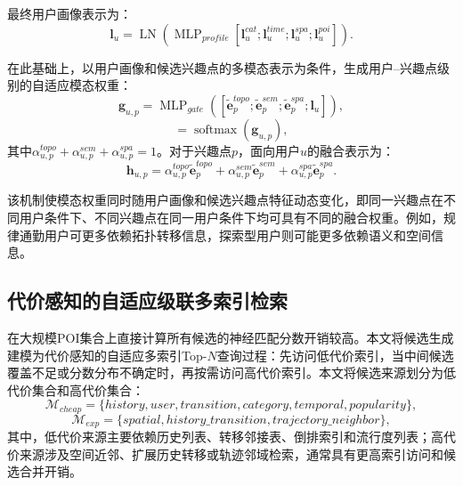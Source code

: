 \documentclass{rjthesis}
\begin{document}
最终用户画像表示为：
\begin{equation}
\mathbf l_u=\operatorname{LN}\left(\operatorname{MLP}_{profile}[\mathbf l_u^{cat};\mathbf l_u^{time};\mathbf l_u^{spa};\mathbf l_u^{poi}]\right).
\end{equation}

在此基础上，以用户画像和候选兴趣点的多模态表示为条件，生成用户--兴趣点级别的自适应模态权重：
\begin{equation}
\mathbf g_{u,p}=\operatorname{MLP}_{gate}\left([
\widetilde{\mathbf e}_p^{topo};
\widetilde{\mathbf e}_p^{sem};
\widetilde{\mathbf e}_p^{spa};
\mathbf l_u]
\right),
\end{equation}
\begin{equation}
[\alpha_{u,p}^{topo},\alpha_{u,p}^{sem},\alpha_{u,p}^{spa}]
=\operatorname{softmax}(\mathbf g_{u,p}),
\end{equation}
其中$\alpha_{u,p}^{topo}+\alpha_{u,p}^{sem}+\alpha_{u,p}^{spa}=1$。对于兴趣点$p$，面向用户$u$的融合表示为：
\begin{equation}
\mathbf h_{u,p}=\alpha_{u,p}^{topo}\widetilde{\mathbf e}_p^{topo}
+\alpha_{u,p}^{sem}\widetilde{\mathbf e}_p^{sem}
+\alpha_{u,p}^{spa}\widetilde{\mathbf e}_p^{spa}.
\end{equation}

该机制使模态权重同时随用户画像和候选兴趣点特征动态变化，即同一兴趣点在不同用户条件下、不同兴趣点在同一用户条件下均可具有不同的融合权重。例如，规律通勤用户可更多依赖拓扑转移信息，探索型用户则可能更多依赖语义和空间信息。


\subsection{代价感知的自适应级联多索引检索}

在大规模POI集合上直接计算所有候选的神经匹配分数开销较高。本文将候选生成建模为代价感知的自适应多索引Top-$N$查询过程：先访问低代价索引，当中间候选覆盖不足或分数分布不确定时，再按需访问高代价索引。本文将候选来源划分为低代价集合和高代价集合：
\begin{equation}
\mathcal M_{cheap}=\{history,user,transition,category,temporal,popularity\},
\end{equation}
\begin{equation}
\mathcal M_{exp}=\{spatial,history\_transition,trajectory\_neighbor\},
\end{equation}
其中，低代价来源主要依赖历史列表、转移邻接表、倒排索引和流行度列表；高代价来源涉及空间近邻、扩展历史转移或轨迹邻域检索，通常具有更高索引访问和候选合并开销。
\end{document}
